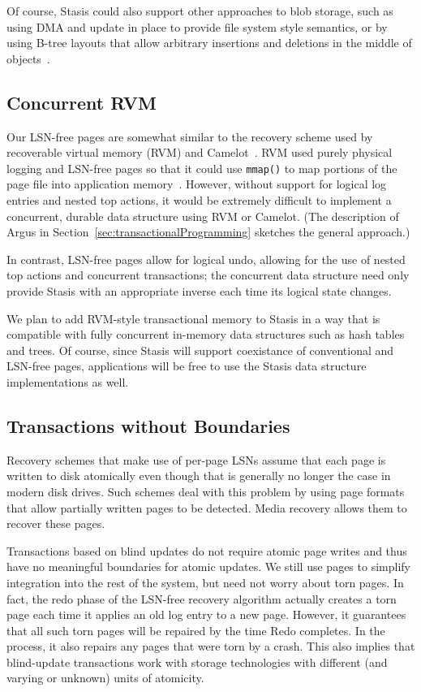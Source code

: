 \documentclass[letterpaper,twocolumn,10pt]{article}
\newcommand{\yad}{Stasis\xspace}
\begin{document}
Of course, \yad could also support other approaches to blob storage,
such as using DMA and update in place to provide file system style
semantics, or by using B-tree layouts that allow arbitrary insertions
and deletions in the middle of objects~\cite{esm}.

\subsection{Concurrent RVM}

Our LSN-free pages are somewhat similar to the recovery scheme used by
recoverable virtual memory (RVM) and Camelot~\cite{camelot}. RVM
used purely physical logging and LSN-free pages so that it
could use {\tt mmap()} to map portions of the page file into application
memory~\cite{lrvm}.  However, without support for logical log entries
and nested top actions, it would be extremely difficult to implement a
concurrent, durable data structure using RVM or Camelot.  (The description of
Argus in Section~\ref{sec:transactionalProgramming} sketches the
general approach.)  

In contrast, LSN-free pages allow for logical
undo, allowing for the use of nested top actions and concurrent
transactions; the concurrent data structure need only provide \yad
with an appropriate inverse each time its logical state changes.

We plan to add RVM-style transactional memory to \yad in a way that is
compatible with fully concurrent in-memory data structures such as
hash tables and trees.  Of course, since \yad will support coexistance
of conventional and LSN-free pages, applications will be free to use
the \yad data structure implementations as well.  


\subsection{Transactions without Boundaries}
\label{sec:torn-page}

Recovery schemes that make use of per-page LSNs assume that each page
is written to disk atomically even though that is generally no longer
the case in modern disk drives.  Such schemes deal with this problem
by using page formats that allow partially written pages to be
detected.  Media recovery allows them to recover these pages.

Transactions based on blind updates do not require atomic page writes
and thus have no meaningful boundaries for atomic updates.  We still
use pages to simplify integration into the rest of the system, but
need not worry about torn pages.  In fact, the redo phase of the
LSN-free recovery algorithm actually creates a torn page each time it
applies an old log entry to a new page.  However, it guarantees that
all such torn pages will be repaired by the time Redo completes.  In
the process, it also repairs any pages that were torn by a crash.
This also implies that blind-update transactions work with storage technologies with
different (and varying or unknown) units of atomicity.
\end{document}
